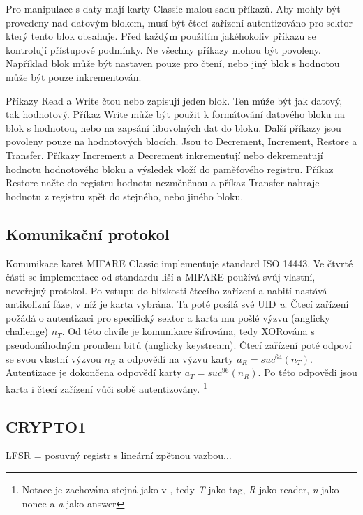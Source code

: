 Pro manipulace s daty mají karty Classic malou sadu příkazů. Aby mohly být provedeny nad datovým blokem, musí být čtecí zařízení autentizováno pro sektor který tento blok obsahuje. Před každým použitím jakéhokoliv příkazu se kontrolují přístupové podmínky. Ne všechny příkazy mohou být povoleny. Například blok může být nastaven pouze pro čtení, nebo jiný blok s hodnotou může být pouze inkrementován.
\par
Příkazy Read a Write čtou nebo zapisují jeden blok. Ten může být jak datový, tak hodnotový. Příkaz Write může být použit k formátování datového bloku na blok s hodnotou, nebo na zapsání libovolných dat do bloku. Další příkazy jsou povoleny pouze na hodnotových blocích. Jsou to Decrement, Increment, Restore a Transfer. Příkazy Increment a Decrement inkrementují nebo dekrementují hodnotu hodnotového bloku a výsledek vloží do paměťového registru. Příkaz Restore načte do registru hodnotu nezměněnou a příkaz Transfer nahraje hodnotu z registru zpět do stejného, nebo jiného bloku\cite{PracticalAttackOnMIFARE}.

\subsection{Komunikační protokol}
Komunikace karet MIFARE Classic implementuje standard ISO 14443. Ve čtvrté části se implementace od standardu liší a MIFARE používá svůj vlastní, neveřejný protokol. Po vstupu do blízkosti čtecího zařízení a nabití nastává antikolizní fáze, v níž je karta vybrána. Ta poté posílá své UID \emph{u}. Čtecí zařízení požádá o autentizaci pro specifický sektor a karta mu pošlé výzvu (anglicky challenge) ${n_T}$\footnotemark. Od této chvíle je komunikace šifrována, tedy XORována s pseudonáhodným proudem bitů (anglicky keystream). Čtecí zařízení poté odpoví se svou vlastní výzvou ${n_R}$ a odpovědí na výzvu karty ${a_R = suc^{64}(n_T)}$. Autentizace je dokončena odpovědí karty ${a_T = suc^{96}(n_R)}$. Po této odpovědi jsou karta i čtecí zařízení vůči sobě autentizovány\cite{Wirelessly_Pickpocketing}. 
\footnote{Notace je zachována stejná jako v \cite{Wirelessly_Pickpocketing}, tedy \emph{T} jako tag, \emph{R} jako reader, \emph{n} jako nonce a \emph{a} jako answer}


\subsection{CRYPTO1}
LFSR = posuvný registr s lineární zpětnou vazbou...

